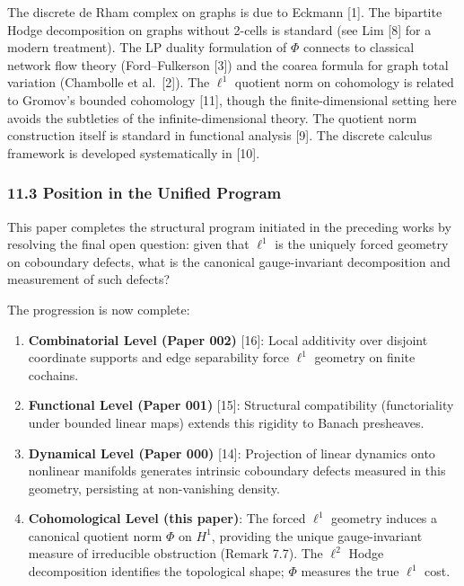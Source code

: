\documentclass[
]{article}
\providecommand{\tightlist}{%
  \setlength{\itemsep}{0pt}\setlength{\parskip}{0pt}}
\begin{document}
The discrete de Rham complex on graphs is due to Eckmann {[}1{]}. The
bipartite Hodge decomposition on graphs without 2-cells is standard (see
Lim {[}8{]} for a modern treatment). The LP duality formulation of
\(\Phi\) connects to classical network flow theory (Ford--Fulkerson
{[}3{]}) and the coarea formula for graph total variation (Chambolle et
al.~{[}2{]}). The \(\ell^1\) quotient norm on cohomology is related to
Gromov's bounded cohomology {[}11{]}, though the finite-dimensional
setting here avoids the subtleties of the infinite-dimensional theory.
The quotient norm construction itself is standard in functional analysis
{[}9{]}. The discrete calculus framework is developed systematically in
{[}10{]}.

\subsubsection{11.3 Position in the Unified
Program}\label{position-in-the-unified-program}

This paper completes the structural program initiated in the preceding
works by resolving the final open question: given that \(\ell^1\) is the
uniquely forced geometry on coboundary defects, what is the canonical
gauge-invariant decomposition and measurement of such defects?

The progression is now complete:

\begin{enumerate}
\def\labelenumi{\arabic{enumi}.}
\tightlist
\item
  \textbf{Combinatorial Level (Paper 002)} {[}16{]}: Local additivity
  over disjoint coordinate supports and edge separability force
  \(\ell^1\) geometry on finite cochains.
\item
  \textbf{Functional Level (Paper 001)} {[}15{]}: Structural
  compatibility (functoriality under bounded linear maps) extends this
  rigidity to Banach presheaves.
\item
  \textbf{Dynamical Level (Paper 000)} {[}14{]}: Projection of linear
  dynamics onto nonlinear manifolds generates intrinsic coboundary
  defects measured in this geometry, persisting at non-vanishing
  density.
\item
  \textbf{Cohomological Level (this paper)}: The forced \(\ell^1\)
  geometry induces a canonical quotient norm \(\Phi\) on \(H^1\),
  providing the unique gauge-invariant measure of irreducible
  obstruction (Remark 7.7). The \(\ell^2\) Hodge decomposition
  identifies the topological shape; \(\Phi\) measures the true
  \(\ell^1\) cost.
\end{enumerate}
\end{document}
